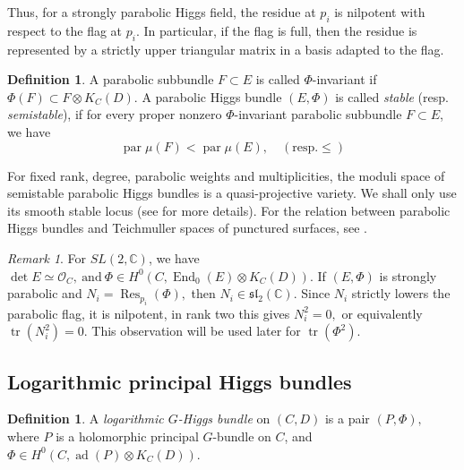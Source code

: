 \documentclass[11pt,reqno]{amsart}
\numberwithin{equation}{section}
\theoremstyle{plain}
\theoremstyle{definition}
\newtheorem{definition}[theorem]{Definition}
\theoremstyle{remark}
\newtheorem{remark}[theorem]{Remark}
\begin{document}
Thus, for a strongly parabolic Higgs field, the residue at \(p_i\) is nilpotent
with respect to the flag at \(p_i\). In particular, if the flag is full, then
the residue is represented by a strictly upper triangular matrix in a basis
adapted to the flag.

\begin{definition}
A parabolic subbundle \(F\subset E\) is called \(\Phi\)-invariant if
\(
        \Phi(F)\subset F\otimes K_C(D).
\)
A parabolic Higgs bundle \((E,\Phi)\) is called \textit{stable} (resp. \textit{semistable}), if for
every proper nonzero \(\Phi\)-invariant parabolic subbundle \(F\subset E\), we have
\[
        \operatorname{par}\mu(F)<\operatorname{par}\mu(E),
        \quad (\text{resp.} \leq)        
\]
\end{definition}

For fixed rank, degree, parabolic weights and multiplicities, the moduli space
of semistable parabolic Higgs bundles is a quasi-projective variety.  We shall
only use its smooth stable locus (see \cite{MehtaSeshadri, Yokogawa, BodenYokogawa, BiswasParabolic} for more details). For the relation between parabolic Higgs bundles and Teichmuller
spaces of punctured surfaces, see \cite{BiswasGastesiGovindarajan}.

\begin{remark}
For \(SL(2,\mathbb C)\), we have
\(
        \det E\simeq\mathcal O_C,
        \ \text{and} \
        \Phi\in H^0(C,\operatorname{End}_0(E)\otimes K_C(D)).
\)
If \((E,\Phi)\) is strongly parabolic and
\(
        N_i=\operatorname{Res}_{p_i}(\Phi),
\)
then
\(
        N_i\in\mathfrak{sl}_2(\mathbb C).
\)
Since \(N_i\) strictly lowers the parabolic flag, it is nilpotent, in rank
two this gives
\(
        N_i^2=0,
\)
or equivalently
\(
        \operatorname{tr}(N_i^2)=0.
\)
This observation will be used later for
\(\operatorname{tr}(\Phi^2)\).
\end{remark}


\subsection{Logarithmic principal Higgs bundles}

\begin{definition}
A \textit{logarithmic \(G\)-Higgs bundle} on \((C,D)\) is a pair
\(
        (P,\Phi),
\)
where \(P\) is a holomorphic principal \(G\)-bundle on \(C\), and
\(
        \Phi\in H^0(C,\operatorname{ad}(P)\otimes K_C(D)).
\)
\end{definition}
\end{document}
